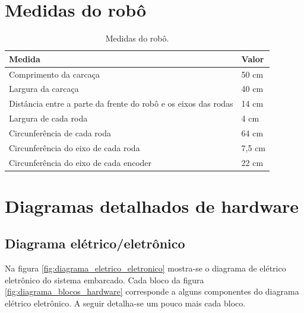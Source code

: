 \apendice



\chapter{Medidas do robô}
\label{cap:medidas_robo}

\begin{table}[H]
  \caption{Medidas do robô.}
  \centering
  \begin{tabular}{l|l}
    \toprule
    \textbf{Medida} & \textbf{Valor} \\
    \midrule
    Comprimento da carcaça & 50 cm \\ \hline
    Largura da carcaça & 40 cm \\ \hline
    Distância entre a parte da frente do robô e os eixos das rodas & 14 cm \\ \hline
    Largura de cada roda & 4 cm \\ \hline
    Circunferência de cada roda & 64 cm \\ \hline
    Circunferência do eixo de cada roda & 7,5 cm \\ \hline
    Circunferência do eixo de cada encoder & 22 cm \\ 
    \bottomrule
  \end{tabular}
  \label{tab:medidas_robo}
\end{table}

\chapter{Diagramas detalhados de hardware}
\section{Diagrama elétrico/eletrônico}

Na figura \ref{fig:diagrama_eletrico_eletronico} mostra-se o diagrama de elétrico eletrônico do sistema embarcado. Cada bloco da figura \ref{fig:diagrama_blocos_hardware} corresponde a alguns componentes do diagrama elétrico eletrônico. A seguir detalha-se um pouco mais cada bloco.

